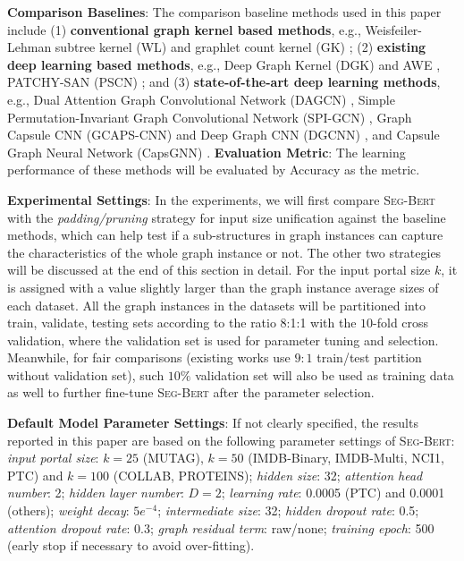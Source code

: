 \documentclass{article}
\newcommand{\our}{\textsc{Seg-Bert}}
\begin{document}
\noindent \textbf{Comparison Baselines}: The comparison baseline methods used in this paper include (1) \textbf{conventional graph kernel based methods}, e.g., Weisfeiler-Lehman subtree kernel (WL) \cite{Shervashidze_WL_11} and graphlet count kernel (GK) \cite{pmlr-v5-shervashidze09a}; (2) \textbf{existing deep learning based methods}, e.g., Deep Graph Kernel (DGK) \cite{Yanardag_Deep_15} and AWE \cite{Ivanov_Anonymous_18}, PATCHY-SAN (PSCN) \cite{Niepert_Learning_16}; and (3) \textbf{state-of-the-art deep learning methods}, e.g., Dual Attention Graph Convolutional Network (DAGCN) \cite{Chen_Dual_19}, Simple Permutation-Invariant Graph Convolutional Network (SPI-GCN) \cite{SPIGCN}, Graph Capsule CNN (GCAPS-CNN) \cite{verma2018graph} and Deep Graph CNN (DGCNN) \cite{Zhang2018AnED}, and Capsule Graph Neural Network (CapsGNN) \cite{xinyi2018capsule}. \textbf{Evaluation Metric}: The learning performance of these methods will be evaluated by Accuracy as the metric.

\noindent \textbf{Experimental Settings}: In the experiments, we will first compare {\our} with the \textit{padding/pruning} strategy for input size unification against the baseline methods, which can help test if a sub-structures in graph instances can capture the characteristics of the whole graph instance or not. The other two strategies will be discussed at the end of this section in detail. For the input portal size $k$, it is assigned with a value slightly larger than the graph instance average sizes of each dataset. All the graph instances in the datasets will be partitioned into train, validate, testing sets according to the ratio 8:1:1 with the $10$-fold cross validation, where the validation set is used for parameter tuning and selection. Meanwhile, for fair comparisons (existing works use $9:1$ train/test partition without validation set), such $10\%$ validation set will also be used as training data as well to further fine-tune {\our} after the parameter selection.

\noindent \textbf{Default Model Parameter Settings}: If not clearly specified, the results reported in this paper are based on the following parameter settings of {\our}: \textit{input portal size}: $k=25$ (MUTAG), $k=50$ (IMDB-Binary, IMDB-Multi, NCI1, PTC) and $k=100$ (COLLAB, PROTEINS); \textit{hidden size}: 32; \textit{attention head number}: 2; \textit{hidden layer number}: $D=2$; \textit{learning rate}: 0.0005 (PTC) and 0.0001 (others); \textit{weight decay}: $5e^{-4}$; \textit{intermediate size}: 32; \textit{hidden dropout rate}: 0.5; \textit{attention dropout rate}: 0.3; \textit{graph residual term}: raw/none; \textit{training epoch}: 500 (early stop if necessary to avoid over-fitting).
\end{document}
